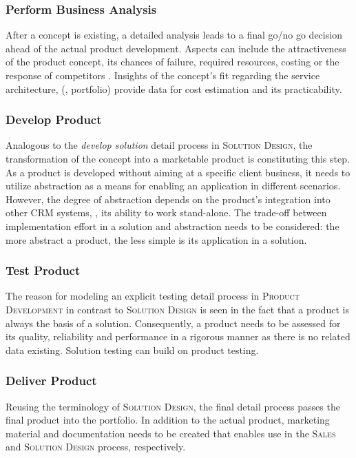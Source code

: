 	\subsubsection{Perform Business Analysis}
	After a concept is existing, a detailed analysis leads to a final go/no go decision ahead of the actual product development. Aspects can include the attractiveness of the product concept, its chances of failure, required resources, costing or the response of competitors \citep[]{cowell1988new}. Insights of the concept's fit regarding the service architecture, (\ie, portfolio) provide data for cost estimation and its practicability. 
	
	\subsubsection{Develop Product}
	Analogous to the \textit{develop solution} detail process in \textsc{Solution Design}, the transformation of the concept into a marketable product is constituting this step. As a product is developed without aiming at a specific client business, it needs to utilize abstraction as a means for enabling an application in different scenarios. However, the degree of abstraction depends on the product's integration into other \acrshort{CRM} systems, \ie, its ability to work stand-alone. The trade-off between implementation effort in a solution and abstraction needs to be considered: the more abstract a product, the less simple is its application in a solution. 
	
	\subsubsection{Test Product}
	The reason for modeling an explicit testing detail process in \textsc{Product Development} in contrast to \textsc{Solution Design} is seen in the fact that a product is always the basis of a solution. Consequently, a product needs to be assessed for its quality, reliability and performance in a rigorous manner as there is no related data existing. Solution testing can build on product testing. 
	
	\subsubsection{Deliver Product}
	Reusing the terminology of \textsc{Solution Design}, the final detail process passes the final product into the portfolio. In addition to the actual product, marketing material and documentation needs to be created that enables use in the \textsc{Sales} and \textsc{Solution Design} process, respectively. 
	
